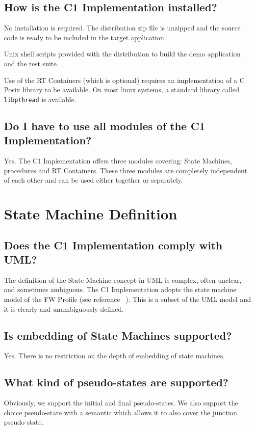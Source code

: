 \documentclass[a4paper,10pt]{article}
\let\stdsection\section
\renewcommand\section{\newpage\stdsection}
\begin{document}
\subsection{How is the C1 Implementation installed?}
No installation is required. The distribution zip file is unzipped and the source code is ready to be included in the target application. 

Unix shell scripts provided with the distribution to build the demo application and the test suite.

Use of the RT Containers (which is optional) requires an implementation of a C Posix library to be available. On most linux systems, a standard library called \texttt{libpthread} is available.  

\subsection{Do I have to use all modules of the C1 Implementation?}
Yes. The C1 Implementation offers three modules covering: State Machines, procedures and RT Containers. These three modules are completely independent of each other and can be used either together or separately.

\section{State Machine Definition}

\subsection{Does the C1 Implementation comply with UML?}
The definition of the State Machine concept in UML is complex, often unclear, and sometimes ambiguous. The C1 Implementation adopts the state machine model 
of the FW Profile (see reference ~\cite{ref:fwprofile}). This is a subset of the UML model and it is clearly and unambiguously defined. 

\subsection{Is embedding of State Machines supported?}
Yes. There is no restriction on the depth of embedding of state machines.

\subsection{What kind of pseudo-states are supported?}
Obviously, we support the initial and final pseudo-states. We also support the choice pseudo-state with a semantic which allows it to also cover the 
junction pseudo-state. 
\end{document}
